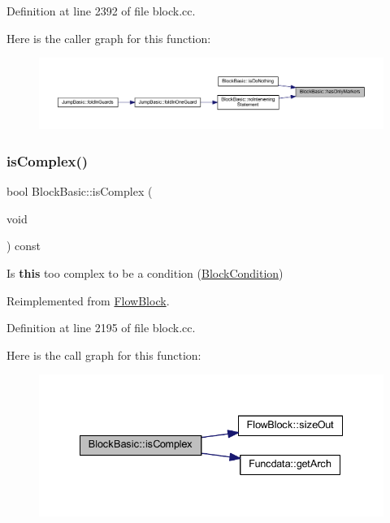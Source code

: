 Definition at line 2392 of file block.\+cc.

Here is the caller graph for this function\+:
\nopagebreak
\begin{figure}[H]
\begin{center}
\leavevmode
\includegraphics[width=350pt]{class_block_basic_a889777af9024df726d21540187277edd_icgraph}
\end{center}
\end{figure}
\mbox{\label{class_block_basic_ad9dc5c967ac739b462614c1b75f93c22}} 
\subsubsection{\texorpdfstring{isComplex()}{isComplex()}}
{\footnotesize\ttfamily bool Block\+Basic\+::is\+Complex (\begin{DoxyParamCaption}\item[{void}]{ }\end{DoxyParamCaption}) const\hspace{0.3cm}{\ttfamily [virtual]}}



Is {\bfseries{this}} too complex to be a condition (\mbox{\hyperlink{class_block_condition}{Block\+Condition}}) 



Reimplemented from \mbox{\hyperlink{class_flow_block_ad77905104bb4077b2d213c27b0582bf7}{Flow\+Block}}.



Definition at line 2195 of file block.\+cc.

Here is the call graph for this function\+:
\nopagebreak
\begin{figure}[H]
\begin{center}
\leavevmode
\includegraphics[width=335pt]{class_block_basic_ad9dc5c967ac739b462614c1b75f93c22_cgraph}
\end{center}
\end{figure}
\mbox{\label{class_block_basic_a08e48137d2fd9fb3faa9c299516b9581}} 
